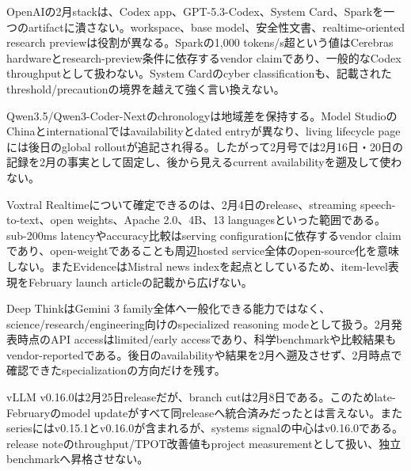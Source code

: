 \begin{claimboundary}
OpenAIの2月stackは、Codex app、GPT-5.3-Codex、System Card、Sparkを一つのartifactに潰さない。workspace、base model、安全性文書、realtime-oriented research previewは役割が異なる。Sparkの1,000 tokens/s超という値はCerebras hardwareとresearch-preview条件に依存するvendor claimであり、一般的なCodex throughputとして扱わない。System Cardのcyber classificationも、記載されたthreshold/precautionの境界を越えて強く言い換えない。\autocite{src-15823ae5556e,src-4a841ea7ec7c,src-9aba7995b6a5,src-dd64fe3084a4}
\end{claimboundary}

\begin{claimboundary}
Qwen3.5/Qwen3-Coder-Nextのchronologyは地域差を保持する。Model StudioのChinaとinternationalではavailabilityとdated entryが異なり、living lifecycle pageには後日のglobal rolloutが追記され得る。したがって2月号では2月16日・20日の記録を2月の事実として固定し、後から見えるcurrent availabilityを遡及して使わない。\autocite{src-eac8dfbeb78c}
\end{claimboundary}

\begin{claimboundary}
Voxtral Realtimeについて確定できるのは、2月4日のrelease、streaming speech-to-text、open weights、Apache 2.0、4B、13 languagesといった範囲である。sub-200ms latencyやaccuracy比較はserving configurationに依存するvendor claimであり、open-weightであることも周辺hosted service全体のopen-source化を意味しない。またEvidenceはMistral news indexを起点としているため、item-level表現をFebruary launch articleの記載から広げない。\autocite{src-d8b7c1c36830}
\end{claimboundary}

\begin{claimboundary}
Deep ThinkはGemini 3 family全体へ一般化できる能力ではなく、science/research/engineering向けのspecialized reasoning modeとして扱う。2月発表時点のAPI accessはlimited/early accessであり、科学benchmarkや比較結果もvendor-reportedである。後日のavailabilityや結果を2月へ遡及させず、2月時点で確認できたspecializationの方向だけを残す。\autocite{src-dd5d9b8662f3}
\end{claimboundary}

\begin{claimboundary}
vLLM v0.16.0は2月25日releaseだが、branch cutは2月8日である。このためlate-Februaryのmodel updateがすべて同releaseへ統合済みだったとは言えない。またseriesにはv0.15.1とv0.16.0が含まれるが、systems signalの中心はv0.16.0である。release noteのthroughput/TPOT改善値もproject measurementとして扱い、独立benchmarkへ昇格させない。\autocite{src-5041feb6f87f,src-67307025f5d9}
\end{claimboundary}

